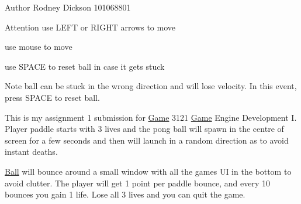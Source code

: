 \begin{DoxyAuthor}{Author}
Rodney Dickson 101068801
\end{DoxyAuthor}
\begin{DoxyAttention}{Attention}
use LEFT or RIGHT arrows to move 

use mouse to move 

use \textquotesingle{}SPACE\textquotesingle{} to reset ball in case it gets stuck
\end{DoxyAttention}
\begin{DoxyNote}{Note}
ball can be stuck in the wrong direction and will lose velocity. In this event, press \textquotesingle{}SPACE\textquotesingle{} to reset ball.
\end{DoxyNote}
This is my assignment 1 submission for \mbox{\hyperlink{class_game}{Game}} 3121 \mbox{\hyperlink{class_game}{Game}} Engine Development I. Player paddle starts with 3 lives and the pong ball will spawn in the centre of screen for a few seconds and then will launch in a random direction as to avoid instant deaths.

\mbox{\hyperlink{class_ball}{Ball}} will bounce around a small window with all the game\textquotesingle{}s UI in the bottom to avoid clutter. The player will get 1 point per paddle bounce, and every 10 bounces you gain 1 life. Lose all 3 lives and you can quit the game. 